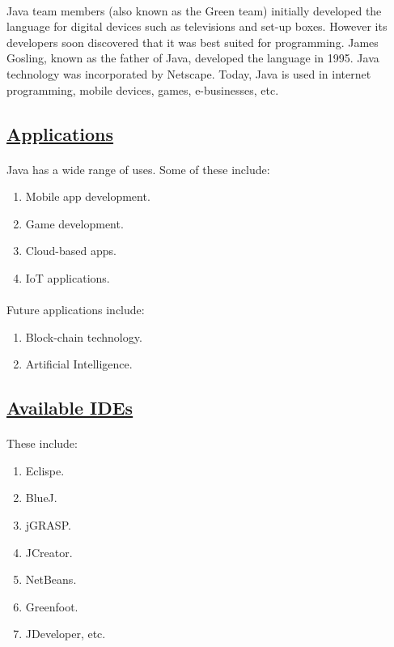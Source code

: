 \documentclass[12pt]{article}
\begin{document}
           \paragraph{}
           Java team members (also known as the Green team) initially developed the language for digital devices such as televisions and set-up boxes. However its developers soon discovered that it was best suited for programming. James Gosling, known as the father of Java, developed the language in 1995. Java technology was incorporated by Netscape. Today, Java is used in internet programming, mobile devices, games, e-businesses, etc.   
    \subsection*{\underline{Applications}}
            \paragraph{}
            Java has a wide range of uses. Some of these include:
            \begin{enumerate}
            	\item Mobile app development.
            	\item Game development.
            	\item Cloud-based apps.
            	\item IoT applications.
             \end{enumerate}
             \paragraph{}
             Future applications include:
             \begin{enumerate}
             	\item Block-chain technology.
             	\item Artificial Intelligence.
             \end{enumerate}       
    \subsection*{\underline{Available IDEs}}
            \paragraph{}
            These include:
            \begin{enumerate}
            	\item Eclispe.
            	\item BlueJ.
            	\item jGRASP.
            	\item JCreator.
            	\item NetBeans.
            	\item Greenfoot.
            	\item JDeveloper, etc.
            \end{enumerate}
\end{document}
